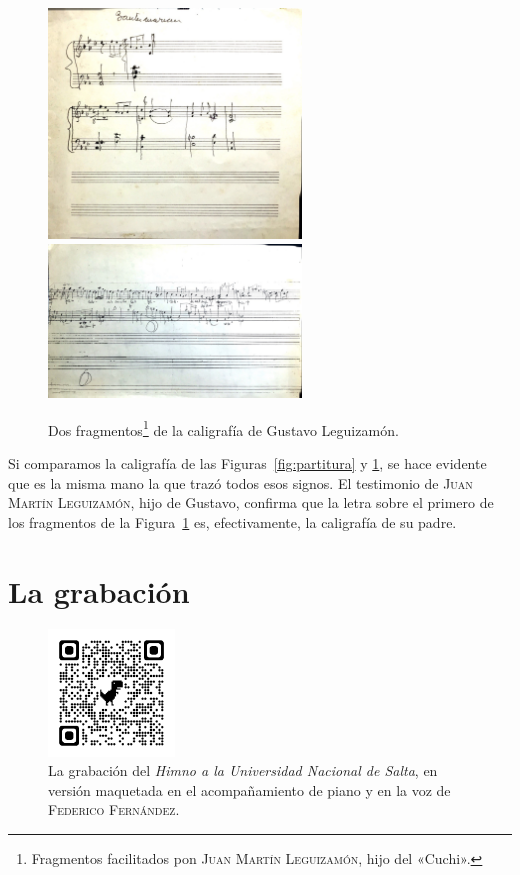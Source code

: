 \begin{figure}[H]
\begin{minipage}{\textwidth}
\centering
\includegraphics[width=0.6\textwidth]{img/manuscrito1}\\
\includegraphics[width=0.6\textwidth]{img/manuscrito2}
\caption[Dos fragmentos de la caligrafía de Gustavo Leguizamón.]{Dos fragmentos\footnote{Fragmentos facilitados pon \textsc{Juan Martín Leguizamón}, hijo del «Cuchi».} de la caligrafía de Gustavo Leguizamón.}
\label{fig:manuscritos}
\end{minipage}
\end{figure}

Si comparamos la caligrafía de las Figuras~\ref{fig:partitura} y \ref{fig:manuscritos}, se hace evidente que es la misma mano la que trazó todos esos signos. El testimonio de \textsc{Juan Martín Leguizamón}, hijo de Gustavo, confirma que la letra sobre el primero de los fragmentos de la Figura~\ref{fig:manuscritos} es, efectivamente, la caligrafía de su padre.


\section{La grabación}
\label{sec:grabacion}

\begin{figure}[H]
\centering
\includegraphics[width=0.3\textwidth]{img/qrcode-himno-fernandez}
\caption[La grabación del \emph{Himno}.]{La grabación del \emph{Himno a la Universidad Nacional de Salta}, en versión maquetada en el acompañamiento de piano y en la voz de \textsc{Federico Fernández}.}
\label{fig:grabacion}
\end{figure}


